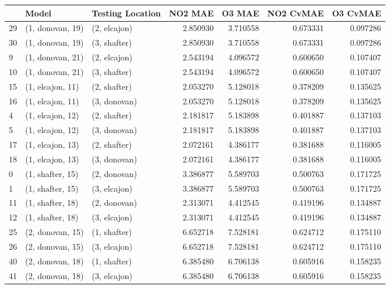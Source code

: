 \begin{tabular}{lllrrrr}
\toprule
{} &             Model & Testing Location &   NO2 MAE &    O3 MAE &  NO2 CvMAE &  O3 CvMAE \\
\midrule
29 &  (1, donovan, 19) &     (2, elcajon) &  2.850930 &  3.710558 &   0.673331 &  0.097286 \\
30 &  (1, donovan, 19) &     (3, shafter) &  2.850930 &  3.710558 &   0.673331 &  0.097286 \\
9  &  (1, donovan, 21) &     (2, elcajon) &  2.543194 &  4.096572 &   0.600650 &  0.107407 \\
10 &  (1, donovan, 21) &     (3, shafter) &  2.543194 &  4.096572 &   0.600650 &  0.107407 \\
15 &  (1, elcajon, 11) &     (2, shafter) &  2.053270 &  5.128018 &   0.378209 &  0.135625 \\
16 &  (1, elcajon, 11) &     (3, donovan) &  2.053270 &  5.128018 &   0.378209 &  0.135625 \\
4  &  (1, elcajon, 12) &     (2, shafter) &  2.181817 &  5.183898 &   0.401887 &  0.137103 \\
5  &  (1, elcajon, 12) &     (3, donovan) &  2.181817 &  5.183898 &   0.401887 &  0.137103 \\
17 &  (1, elcajon, 13) &     (2, shafter) &  2.072161 &  4.386177 &   0.381688 &  0.116005 \\
18 &  (1, elcajon, 13) &     (3, donovan) &  2.072161 &  4.386177 &   0.381688 &  0.116005 \\
0  &  (1, shafter, 15) &     (2, donovan) &  3.386877 &  5.589703 &   0.500763 &  0.171725 \\
1  &  (1, shafter, 15) &     (3, elcajon) &  3.386877 &  5.589703 &   0.500763 &  0.171725 \\
11 &  (1, shafter, 18) &     (2, donovan) &  2.313071 &  4.412545 &   0.419196 &  0.134887 \\
12 &  (1, shafter, 18) &     (3, elcajon) &  2.313071 &  4.412545 &   0.419196 &  0.134887 \\
25 &  (2, donovan, 15) &     (1, shafter) &  6.652718 &  7.528181 &   0.624712 &  0.175110 \\
26 &  (2, donovan, 15) &     (3, elcajon) &  6.652718 &  7.528181 &   0.624712 &  0.175110 \\
40 &  (2, donovan, 18) &     (1, shafter) &  6.385480 &  6.706138 &   0.605916 &  0.158235 \\
41 &  (2, donovan, 18) &     (3, elcajon) &  6.385480 &  6.706138 &   0.605916 &  0.158235 \\

\end{tabular}

